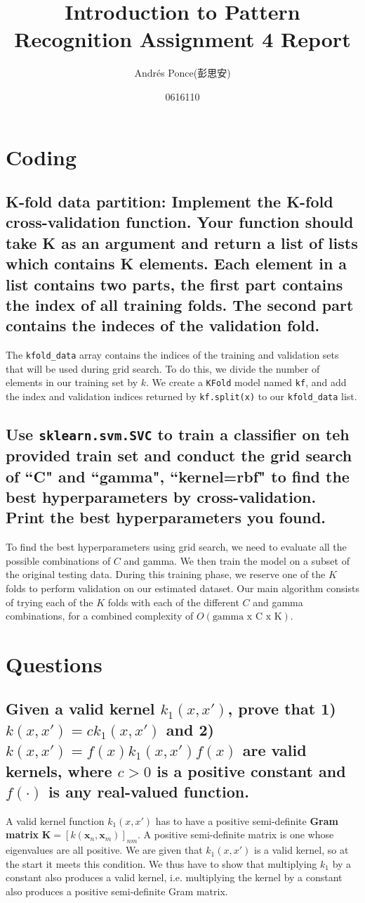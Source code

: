\documentclass{article}
\title{Introduction to Pattern Recognition Assignment 4 Report}
\author{ Andr\'es Ponce(彭思安) \\
\and
0616110
}
\begin{document}
\maketitle
\section{Coding}
\subsection{K-fold data partition: Implement the K-fold cross-validation function.
	Your function should take K as an argument and return a list of lists which 
	contains K elements.
	Each element in a list contains two parts, the first part contains the index of all
		training folds.
	The second part contains the indeces of the validation fold.}

The \texttt{kfold\_data} array contains the indices of the training and validation sets
		that will be used during grid search. 
To do this, we divide the number of elements in our training set by $k$.
We create a \texttt{KFold} model named \texttt{kf}, and add the index and validation indices
	returned by \texttt{kf.split(x)} to our \texttt{kfold\_data} list.
\subsection{Use \texttt{sklearn.svm.SVC} to train a classifier on teh provided train set and 
	conduct the grid search of ``C" and ``gamma", ``kernel=rbf" to find the best hyperparameters
	by cross-validation. Print the best hyperparameters you found.}
To find the best hyperparameters using grid search, we need to evaluate all the possible combinations
of $C$ and gamma. 
We then train the model on a subset of the original testing data. 
During this training phase, we reserve one of the $K$ folds to perform  validation on our estimated
	dataset.
Our main algorithm consists of trying each of the $K$ folds with each of the different $C$ and gamma 
	combinations, for a combined complexity of $O(\textrm{gamma x C x K})$.
\section{Questions}
	\subsection{Given a valid kernel $k_{1}(x, x')$, prove that 1)
		$k(x, x') = ck_{1}(x, x')$ and 2) $k(x, x') = f(x)k_{1}(x, x')f(x)$ are 
		valid kernels, where $c > 0$ is a positive constant and $f(\cdot)$ is any 
		real-valued function.}
	A valid kernel function $k_{1}(x, x')$ has to have a positive semi-definite \textbf{Gram matrix}
		$\mathbf{K} = [k(\mathbf{x}_{n}, \mathbf{x}_{m})]_{nm}$.
	A positive semi-definite matrix is one whose eigenvalues are all positive. 
	We are given that $k_{1}(x, x')$ is a valid kernel, so at the start it meets this condition.
	We thus have to show that multiplying $k_{1}$ by a constant also produces a valid kernel,
		i.e. multiplying the kernel by a constant also produces a positive semi-definite Gram matrix.
\end{document}
